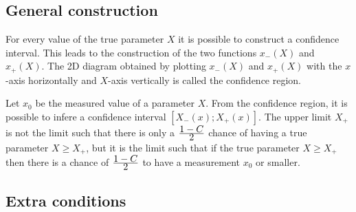 {{    

\subsection{General construction}
	For every value of the true parameter $X$ it is possible to construct a confidence interval. This leads to the construction of the two functions $x_-(X)$ and $x_+(X)$. The 2D diagram obtained by plotting $x_-(X)$ and $x_+(X)$ with the $x$-axis horizontally and $X$-axis vertically is called the confidence region.
    \begin{theorem}
		Let $x_0$ be the measured value of a parameter $X$. From the confidence region, it is possible to infere a confidence interval $[X_-(x);X_+(x)]$. The upper limit $X_+$ is not the limit such that there is only a $\stylefrac{1-C}{2}$ chance of having a true parameter $X\geq X_+$, but it is the limit such that if the true parameter $X\geq X_+$ then there is a chance of $\stylefrac{1-C}{2}$ to have a measurement $x_0$ or smaller.
	\end{theorem}
    
\subsection{Extra conditions}
	}}
